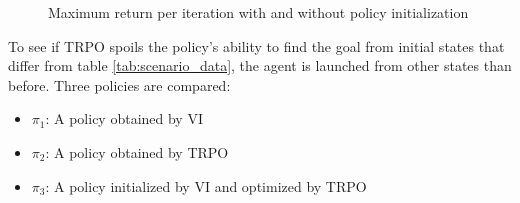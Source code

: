 \begin{figure}[hbt]
	\caption{Maximum return per iteration with and without policy initialization}
	\label{tikz:trpoglorotvi1000mMax}
\end{figure}
\newpage
\FloatBarrier

To see if TRPO spoils the policy's ability to find the goal from initial states that differ from table \ref{tab:scenario_data}, the agent is launched from other states than before. Three policies are compared:

\begin{itemize}
	\item $\pi_1$: A policy obtained by VI
	\item $\pi_2$: A policy obtained by TRPO
	\item $\pi_3$: A policy initialized by VI and optimized by TRPO
\end{itemize}

